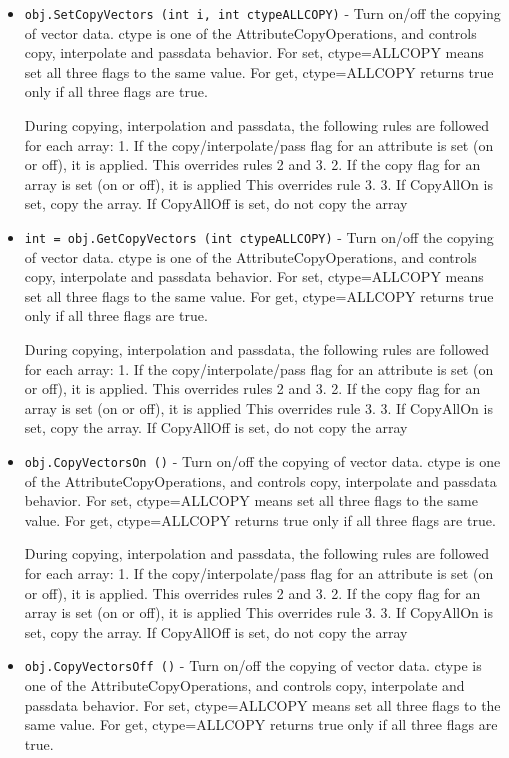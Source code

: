 \begin{itemize}
\item  \verb|obj.SetCopyVectors (int i, int ctypeALLCOPY)| -  Turn on/off the copying of vector data.
 ctype is one of the AttributeCopyOperations, and controls copy, 
 interpolate and passdata behavior.
 For set, ctype=ALLCOPY means set all three flags to the same value.
 For get, ctype=ALLCOPY returns true only if all three flags are true.

 During copying, interpolation and passdata, the following rules are 
 followed for each array:
 1. If the copy/interpolate/pass flag for an attribute is set (on or off), it is applied.
    This overrides rules 2 and 3.
 2. If the copy flag for an array is set (on or off), it is applied
    This overrides rule 3.
 3. If CopyAllOn is set, copy the array.
    If CopyAllOff is set, do not copy the array

\item  \verb|int = obj.GetCopyVectors (int ctypeALLCOPY)| -  Turn on/off the copying of vector data.
 ctype is one of the AttributeCopyOperations, and controls copy, 
 interpolate and passdata behavior.
 For set, ctype=ALLCOPY means set all three flags to the same value.
 For get, ctype=ALLCOPY returns true only if all three flags are true.

 During copying, interpolation and passdata, the following rules are 
 followed for each array:
 1. If the copy/interpolate/pass flag for an attribute is set (on or off), it is applied.
    This overrides rules 2 and 3.
 2. If the copy flag for an array is set (on or off), it is applied
    This overrides rule 3.
 3. If CopyAllOn is set, copy the array.
    If CopyAllOff is set, do not copy the array

\item  \verb|obj.CopyVectorsOn ()| -  Turn on/off the copying of vector data.
 ctype is one of the AttributeCopyOperations, and controls copy, 
 interpolate and passdata behavior.
 For set, ctype=ALLCOPY means set all three flags to the same value.
 For get, ctype=ALLCOPY returns true only if all three flags are true.

 During copying, interpolation and passdata, the following rules are 
 followed for each array:
 1. If the copy/interpolate/pass flag for an attribute is set (on or off), it is applied.
    This overrides rules 2 and 3.
 2. If the copy flag for an array is set (on or off), it is applied
    This overrides rule 3.
 3. If CopyAllOn is set, copy the array.
    If CopyAllOff is set, do not copy the array

\item  \verb|obj.CopyVectorsOff ()| -  Turn on/off the copying of vector data.
 ctype is one of the AttributeCopyOperations, and controls copy, 
 interpolate and passdata behavior.
 For set, ctype=ALLCOPY means set all three flags to the same value.
 For get, ctype=ALLCOPY returns true only if all three flags are true.


\end{itemize}
